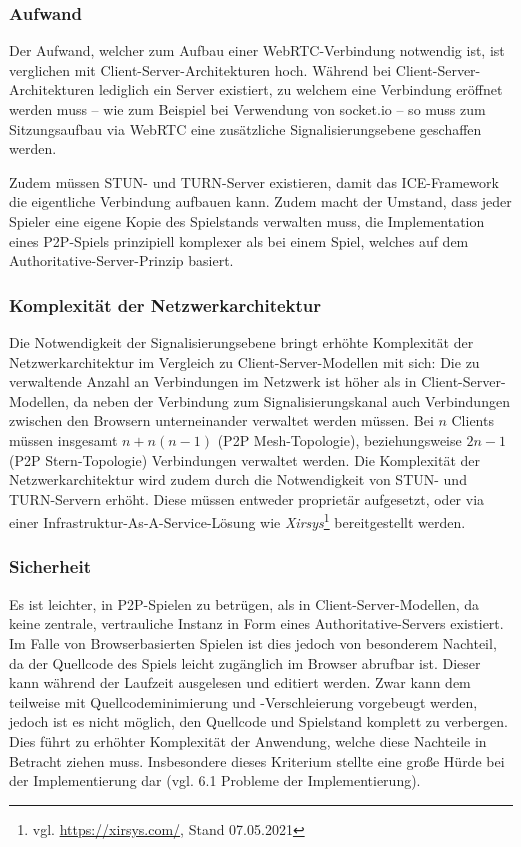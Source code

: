 \subsubsection{Aufwand}
Der Aufwand, welcher zum Aufbau einer WebRTC-Verbindung notwendig ist, ist verglichen mit Client-Server-Architekturen hoch. Während bei Client-Server-Architekturen lediglich ein Server existiert, zu welchem eine Verbindung eröffnet werden muss -- wie zum Beispiel bei Verwendung von socket.io -- so muss zum Sitzungsaufbau via WebRTC eine zusätzliche Signalisierungsebene geschaffen werden. 

Zudem müssen STUN- und TURN-Server existieren, damit das \acs{ICE}-Framework die eigentliche Verbindung aufbauen kann. Zudem macht der Umstand, dass jeder Spieler eine eigene Kopie des Spielstands verwalten muss, die Implementation eines \acs{P2P}-Spiels prinzipiell komplexer als bei einem Spiel, welches auf dem Authoritative-Server-Prinzip basiert.

\subsubsection{Komplexität der Netzwerkarchitektur}
Die Notwendigkeit der Signalisierungsebene bringt erhöhte Komplexität der Netzwerkarchitektur im Vergleich zu Client-Server-Modellen mit sich: Die zu verwaltende Anzahl an Verbindungen im Netzwerk ist höher als in Client-Server-Modellen, da neben der Verbindung zum Signalisierungskanal auch Verbindungen zwischen den Browsern unterneinander verwaltet werden müssen. Bei $n$ Clients müssen insgesamt $n + n(n-1)$ (P2P Mesh-Topologie), beziehungsweise $2n - 1$ (P2P Stern-Topologie) Verbindungen verwaltet werden. Die Komplexität der Netzwerkarchitektur wird zudem durch die Notwendigkeit von \acs{STUN}- und \acs{TURN}-Servern erhöht. Diese müssen entweder proprietär aufgesetzt, oder via einer Infrastruktur-As-A-Service-Lösung wie \textit{Xirsys}\footnote{vgl. \url{https://xirsys.com/}, Stand 07.05.2021} bereitgestellt werden.

\subsubsection{Sicherheit}
Es ist leichter, in \acs{P2P}-Spielen zu betrügen, als in Client-Server-Modellen, da keine zentrale, vertrauliche Instanz in Form eines Authoritative-Servers existiert. Im Falle von Browserbasierten Spielen ist dies jedoch von besonderem Nachteil, da der Quellcode des Spiels leicht zugänglich im Browser abrufbar ist. Dieser kann während der Laufzeit ausgelesen und editiert werden. Zwar kann dem teilweise mit Quellcodeminimierung und -Verschleierung vorgebeugt werden, jedoch ist es nicht möglich, den Quellcode und Spielstand komplett zu verbergen. Dies führt zu erhöhter Komplexität der Anwendung, welche diese Nachteile in Betracht ziehen muss. Insbesondere dieses Kriterium stellte eine große Hürde bei der Implementierung dar (vgl. 6.1 Probleme der Implementierung).


